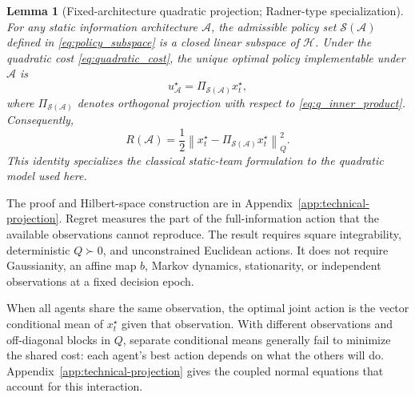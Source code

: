 \documentclass[11pt]{article}
\newtheorem{lemma}{Lemma}
\begin{document}
\begin{lemma}[Fixed-architecture quadratic projection; Radner-type specialization]
\label{lem:radner_projection}
For any static information architecture $\mathcal{A}$, the admissible policy set
$\mathcal{S}(\mathcal{A})$ defined in \eqref{eq:policy_subspace} is a closed
linear subspace of $\mathcal{H}$. Under the quadratic cost
\eqref{eq:quadratic_cost}, the unique optimal policy implementable under
$\mathcal{A}$ is
\begin{equation}
    u_{\mathcal{A}}^\star
    =
    \Pi_{\mathcal{S}(\mathcal{A})}
    x_t^\star,
    \label{eq:optimal_projection}
\end{equation}
where $\Pi_{\mathcal{S}(\mathcal{A})}$ denotes orthogonal projection with
respect to \eqref{eq:q_inner_product}. Consequently,
\begin{equation}
    \boxed{
    R(\mathcal{A})
    =
    \frac{1}{2}
    \left\|
        x_t^\star
        -
        \Pi_{\mathcal{S}(\mathcal{A})}
        x_t^\star
    \right\|_Q^2 .
    }
    \label{eq:projection_regret}
\end{equation}
This identity specializes the classical static-team formulation
\cite{radner1962team} to the quadratic model used here.
\end{lemma}

The proof and Hilbert-space construction are in
Appendix~\ref{app:technical-projection}. Regret measures the part of the
full-information action that the available observations cannot reproduce.
The result requires square integrability, deterministic $Q\succ0$, and
unconstrained Euclidean actions. It does not require Gaussianity, an affine
map $b$, Markov dynamics, stationarity, or independent observations at a
fixed decision epoch.

When all agents share the same observation, the optimal joint action is
the vector conditional mean of $x_t^\star$ given that observation. With
different observations and off-diagonal blocks in $Q$, separate conditional
means generally fail to minimize the shared cost: each agent's best action
depends on what the others will do. Appendix~\ref{app:technical-projection}
gives the coupled normal equations that account for this interaction.
\end{document}
